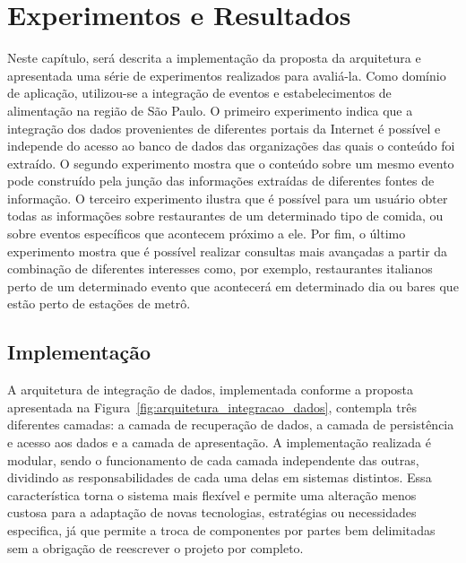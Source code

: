 \chapter{Experimentos e Resultados}
\label{cap:resultados}

Neste capítulo, será descrita a implementação da proposta da arquitetura e apresentada uma série de experimentos realizados para avaliá-la. Como domínio de aplicação, utilizou-se a integração de eventos e estabelecimentos de alimentação na região de São Paulo. O primeiro experimento indica que a integração dos dados provenientes de diferentes portais da Internet é possível e independe do acesso ao banco de dados das organizações das quais o conteúdo foi extraído. O segundo experimento mostra que o conteúdo sobre um mesmo evento pode construído pela junção das informações extraídas de diferentes fontes de informação. O terceiro experimento ilustra que é possível para um usuário obter todas as informações sobre restaurantes de um determinado tipo de comida, ou sobre eventos específicos que acontecem próximo a ele. Por fim, o último experimento mostra que é possível realizar consultas mais avançadas a partir da combinação de diferentes interesses como, por exemplo, restaurantes italianos perto de um determinado evento que acontecerá em determinado dia ou bares que estão perto de estações de metrô.

\section{Implementação}
\label{sec:implementacao}

A arquitetura de integração de dados, implementada conforme a proposta apresentada na Figura~\ref{fig:arquitetura_integracao_dados}, contempla três diferentes camadas: a camada de recuperação de dados, a camada de persistência e acesso aos dados e a camada de apresentação. A implementação realizada é modular, sendo o funcionamento de cada camada independente das outras, dividindo as responsabilidades de cada uma delas em sistemas distintos. Essa característica torna o sistema mais flexível e permite uma alteração menos custosa para a adaptação de novas tecnologias, estratégias ou necessidades especifica, já que permite a troca de componentes por partes bem delimitadas sem a obrigação de reescrever o projeto por completo.

